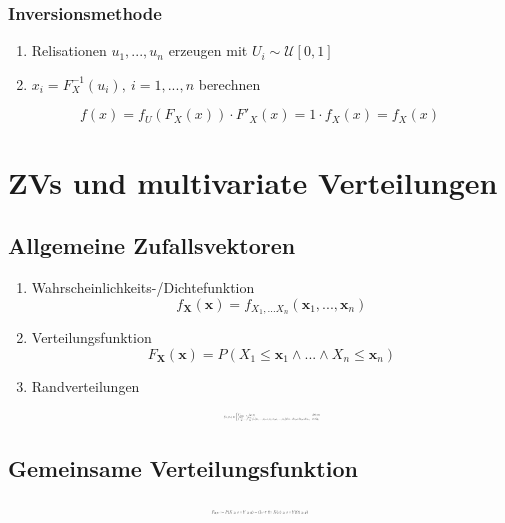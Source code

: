 \documentclass[10pt,a4paper,landscape]{article}
\begin{document}
\begin{multicols}{4}
\subsubsection{Inversionsmethode}
\begin{enumerate}
\item Relisationen $u_1, ..., u_n$ erzeugen mit $U_i \sim \mathcal{U}[0,1]$
\item $x_i=F_X^{-1}(u_i),~i=1,...,n$ berechnen
\end{enumerate}

\[
f(x)=f_U(F_X(x))\cdot F'_X(x)=1 \cdot f_X(x)=f_X(x)
\]


\section{ZVs und multivariate Verteilungen}

\subsection{Allgemeine Zufallsvektoren}
\begin{enumerate}
\item Wahrscheinlichkeits-/Dichtefunktion
\[
f_\textbf{X}(\textbf{x})=f_{X_1,...X_n}(\textbf{x}_1, ..., \textbf{x}_n)
\]
\item Verteilungsfunktion
\[
F_\textbf{X}(\textbf{x})=P(X_1 \leq \textbf{x}_1 \wedge ... \wedge X_n \leq \textbf{x}_n)
\]
\item Randverteilungen
\[ \resizebox{0.2\textwidth}{!}{$
f_{X_i}(x_i)=\begin{cases}
\sum_{\textbf{x}:\textbf{x}_i=x_i}f_\textbf{X}(\textbf{x}) &\text{diskret} \\
\int_{- \infty}^{+\infty} ... \int_{- \infty}^{+\infty} f_{\textbf{x}}(u_1, ..., u_{i-1}, x_i, u_{i+1}, ..., u_n) du_1 ...du_{i-1}du_{i+1}du_m &\text{stetig}
\end{cases}
$}
\]
\end{enumerate}

\subsection{Gemeinsame Verteilungsfunktion}
\[ \resizebox{0.2\textwidth}{!}{$
F_{X,Y}:=P(X \leq x \wedge Y \leq y) = (\{\omega \in \Omega : X(\omega) \leq x \wedge Y(\Omega) \leq y\}
$}
\]


\end{multicols}
\end{document}
